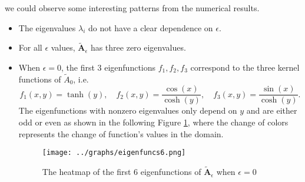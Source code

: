 \documentclass[1 [leqno, 11pt]{amsart}
\numberwithin{equation}{section}
\let\ep=\epsilon
\begin{document}
\begin{CJK*}{GBK}{song}
we could observe some interesting patterns from the numerical results.
\begin{itemize}
\item The eigenvalues $\lambda_i$ do not have a clear dependence on $\epsilon$.
\item For all $\epsilon$ values, $\mathbf{\tilde{A}}_\ep$ has three zero eigenvalues.
\item When $\ep = 0$, the first 3 eigenfunctions $f_1, f_2, f_3$ correspond to the three kernel functions of $\tilde{A}_0$, i.e.
$$f_1(x,y) = \tanh(y),\quad f_2(x,y) = \frac{\cos(x)}{\cosh(y)},\quad f_3(x,y) = \frac{\sin(x)}{\cosh(y)}.$$
The eigenfunctions with nonzero eigenvalues only depend on $y$ and are either odd or even as shown in the following Figure \ref{fig:8thFig}, where the change of colors represents the change of function's values in the domain.

\begin{figure}[ht]
    \centering
	\texttt{[image: ../graphs/eigenfuncs6.png]}
	\caption{The heatmap of the first 6 eigenfunctions of $\mathbf{\tilde{A}}_\ep$ when $\ep = 0$}
	\label{fig:8thFig}
\end{figure}
\fi


\end{itemize}
\end{CJK*}
\end{document}
